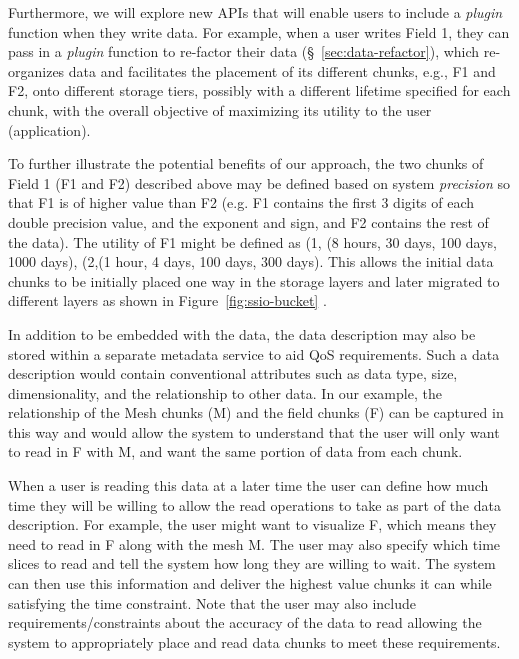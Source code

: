 Furthermore, we will explore new APIs that will enable users to include a {\it plugin} function when 
they write data. For example, when a user writes Field 1, they can pass in a {\it plugin} function 
to re-factor their data (\S~\ref{sec:data-refactor}), which re-organizes data and facilitates the 
placement of its different chunks, e.g., F1 and F2,  onto different storage tiers, possibly with 
a different lifetime specified for each chunk, with the overall objective of maximizing its 
utility to the user (application).

To further illustrate the potential benefits of our approach, the two chunks of Field 1 (F1 and F2) 
described above may be defined based on system {\it precision} so that F1 is of higher value 
than F2 (e.g. F1 contains the first 3 digits of each double precision value, and the exponent and 
sign, and F2 contains the rest of the data). 
%
The utility of F1 might be defined as (1, (8 hours, 30 days, 100 days, 1000 days), 
(2,(1 hour, 4 days, 100 days, 300 days). This allows the initial data chunks to be initially 
placed one way in the storage layers and later migrated to different layers as shown in 
Figure~\ref{fig:ssio-bucket} .
 
In addition to be embedded with the data, the data description may also be stored within 
a separate metadata service to aid QoS requirements. Such a data description would contain
conventional attributes such as data type, size, dimensionality, and the relationship to other 
data. In our example, the relationship of the Mesh chunks (M) and the field chunks (F) can 
be captured in this way and would allow the system to understand that the user will only 
want to read in F with M, and want the same portion of data from each chunk.

When a user is reading this data at a later time the user can define how much time they will 
be willing to allow the read operations to take as part of the data description. For example, 
the user might want to visualize F, which means they need to read in F along with the mesh 
M. The user may also specify which time slices to read and tell the system how long they 
are willing to wait. The system can then use this information and deliver the highest value 
chunks it can while satisfying the time constraint.  Note that the user may also include 
requirements/constraints about the accuracy of the data to read allowing the system to 
appropriately place and read data chunks to meet these requirements.

